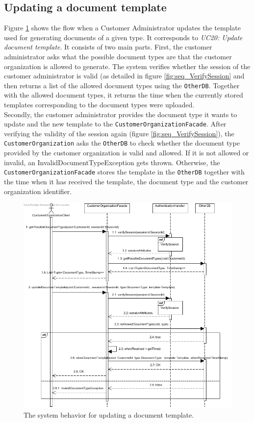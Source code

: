 \documentclass[a4paper,10pt]{article}
\begin{document}
\subsection{Updating a document template}
\label{scenario:UpdateDocTemplate}
Figure \ref{fig:seq_UC20UpdateDocumentTemplate} shows the flow when a Customer Administrator updates the template used for generating documents of a given type. It corresponds to \emph{UC20: Update document template}. It consists of two main parts. First, the customer administrator asks what the possible document types are that the customer organization is allowed to generate. The system verifies whether the session of the customer administrator is valid (as detailed in figure \ref{fig:seq_VerifySession} and then returns a list of the allowed document types using the \texttt{OtherDB}.  Together with the allowed document types, it returns the  time when the currently stored templates corresponding to the document types were uploaded.\\
Secondly, the customer administrator provides the document type it wants to update and the new template to the \texttt{CustomerOrganizationFacade}. After verifying the validity of the session again (figure \ref{fig:seq_VerifySession}), the \texttt{CustomerOrganization} asks the \texttt{OtherDB} to check whether the document type provided by the customer organization is valid and allowed. If it is not allowed or invalid, an InvalidDocumentTypeException gets thrown. Otherwise, the \texttt{CustomerOrganizationFacade} stores the template in the \texttt{OtherDB} together with the time when it has received the template, the document type and the customer organization identifier.

\begin{figure}[!htp]
    \centering
    \includegraphics[width=\textwidth]{Seq_UC20UpdateDocumentTemplate.png}
    \caption{The system behavior for updating a document template.
        }\label{fig:seq_UC20UpdateDocumentTemplate}
\end{figure}
\end{document}
